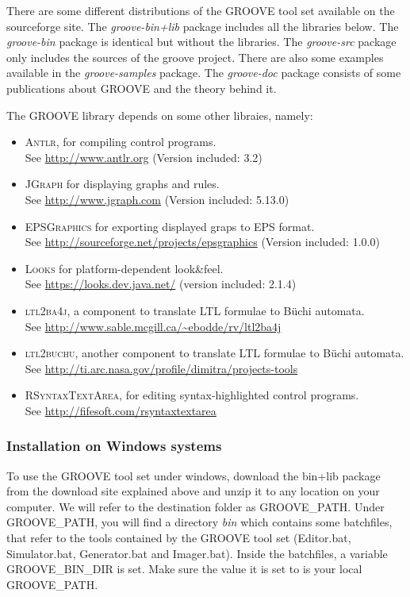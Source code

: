 There are some different distributions of the GROOVE tool set available on the
sourceforge site. The \emph{groove-bin+lib} package includes all the libraries
below. The \emph{groove-bin} package is identical but without the libraries.
The \emph{groove-src} package only includes the sources of the groove project.
There are also some examples available in the \emph{groove-samples} package.
The \emph{groove-doc} package consists of some publications about GROOVE and
the theory behind it.


The GROOVE library depends on some other libraies, namely:

\begin{itemize}\noitemsep
\item \textsc{Antlr}, for compiling control programs. \\
  See \url{http://www.antlr.org} (Version included: 3.2)
\item \textsc{JGraph} for displaying graphs and rules. \\
  See \url{http://www.jgraph.com} (Version included: 5.13.0)
\item \textsc{EPSGraphics} for exporting displayed graps to EPS format. \\
  See \url{http://sourceforge.net/projects/epsgraphics} (Version included: 1.0.0)
\item \textsc{Looks} for platform-dependent look\&feel. \\
  See \url{https://looks.dev.java.net/} (version included: 2.1.4)
\item \textsc{ltl2ba4j}, a component to translate LTL formulae to B\"uchi
  automata. \\ See \url{http://www.sable.mcgill.ca/~ebodde/rv/ltl2ba4j}
\item \textsc{ltl2buchu}, another component to translate LTL formulae to
  B\"uchi automata. \\ See \url{http://ti.arc.nasa.gov/profile/dimitra/projects-tools}
\item \textsc{RSyntaxTextArea}, for editing syntax-highlighted control
  programs. \\ See \url{http://fifesoft.com/rsyntaxtextarea}
\end{itemize}


\subsubsection{Installation on Windows systems}

To use the GROOVE tool set under windows, download the bin+lib package from the
download site explained above and unzip it to any location on your computer. We
will refer to the destination folder as GROOVE\_PATH. Under GROOVE\_PATH, you
will find a directory \emph{bin} which contains some batchfiles, that refer to
the tools contained by the GROOVE tool set (Editor.bat, Simulator.bat,
Generator.bat and Imager.bat). Inside the batchfiles, a variable
GROOVE\_BIN\_DIR is set. Make sure the value it is set to is your local
GROOVE\_PATH.

